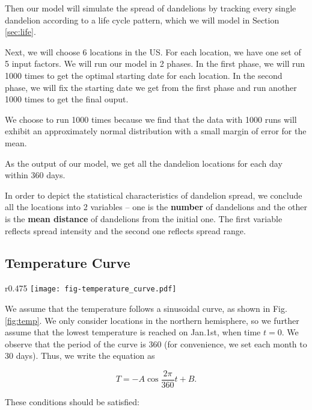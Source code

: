 \documentclass[12pt]{article}
\begin{document}
		\vspace{-0.5cm}
		Then our model will simulate the spread of dandelions by tracking every single dandelion according to a life cycle pattern, which we will model in Section \ref{sec:life}.  
		
		Next, we will choose 6 locations in the US.  For each location, we have one set of 5 input factors. We will run our model in 2 phases.  In the first phase, we will run 1000 times to get the optimal starting date for each location.  In the second phase, we will fix the starting date we get from the first phase and run another 1000 times to get the final ouput.
		
		We choose to run 1000 times because we find that the data with 1000 runs will exhibit an approximately normal distribution with a small margin of error for the mean.

		As the output of our model, we get all the dandelion locations for each day within 360 days.  
		
		In order to depict the statistical characteristics of dandelion spread, we conclude all the locations into 2 variables -- one is the \textbf{number} of dandelions and the other is the \textbf{mean distance} of dandelions from the initial one.  The first variable reflects spread intensity and the second one reflects spread range.


	
	\subsection{Temperature Curve}
	\label{sec:temp}
	
		\begin{wrapfigure}{r}{0.475\textwidth}
			\vspace{-0.4cm}
			\centering
			\texttt{[image: fig-temperature\_curve.pdf]}
			\caption{Temperature curve}
			\label{fig:temp}
		\end{wrapfigure}
		
		We assume that the temperature follows a sinusoidal curve, as shown in Fig.\ref{fig:temp}.  We only consider locations in the northern hemisphere, so we further assume that the lowest temperature is reached on Jan.1st, when time $t = 0$.  We observe that the period of the curve is 360 (for convenience, we set each month to 30 days).  Thus, we write the equation as
		
		\[
			T = -A \cos{\frac{2\pi}{360} t} + B.
		\]
		
		These conditions should be satisfied:
		
\end{document}
